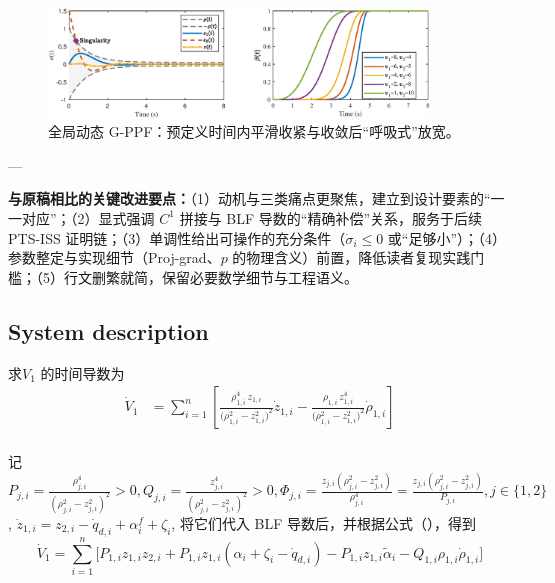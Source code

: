\documentclass[pdflatex,sn-mathphys-num]{sn-jnl}%
\theoremstyle{thmstyleone}%
\theoremstyle{thmstyletwo}%
\theoremstyle{thmstylethree}%
\begin{document}
\begin{figure}[H]
\centering
\includegraphics[width=0.9\textwidth]{fig1.eps}
\caption{全局动态 G-PPF：预定义时间内平滑收紧与收敛后“呼吸式”放宽。}
\label{fig:1}
\end{figure}

---

\noindent\textbf{与原稿相比的关键改进要点：}（1）动机与三类痛点更聚焦，建立到设计要素的“一一对应”；（2）显式强调 $C^1$ 拼接与 BLF 导数的“精确补偿”关系，服务于后续 PTS-ISS 证明链；（3）单调性给出可操作的充分条件（$\dot\sigma_i\le 0$ 或“足够小”）；（4）参数整定与实现细节（Proj-grad、$p$ 的物理含义）前置，降低读者复现实践门槛；（5）行文删繁就简，保留必要数学细节与工程语义。










\subsection{System description}



求$V_1$ 的时间导数为
\begin{equation}\label{eq:25}
	\begin{aligned}
\dot V_1
&=\sum_{i=1}^{n}\left[
\frac{\rho_{1,i}^4\,z_{1,i}}{\big(\rho_{1,i}^{2}-z_{1,i}^{2}\big)^{2}}\dot z_{1,i}
-
\frac{\rho_{1,i}\,z_{1,i}^{4}}{\big(\rho_{1,i}^{2}-z_{1,i}^{2}\big)^{2}}\dot \rho_{1,i}
\right]\\
\end{aligned}
\end{equation}

记
$
P_{j,i}=\frac{\rho_{j,i}^4}{(\rho_{j,i}^2-z_{j,i}^2)^2}>0,
Q_{j,i}=\frac{ z_{j,i}^4}{(\rho_{j,i}^2-z_{j,i}^2)^2}>0,
\Phi_{j,i}=\frac{z_{j,i}\left(\rho_{j,i}^{2}-z_{j,i}^{2}\right)}{\rho_{j,i}^{4}}=\frac{z_{j,i}(\rho_{j,i}^2-z_{j,i}^2)}{P_{j,i}}, j\in\{1,2\}
$,
$\dot z_{1,i}= z_{2,i}-\dot q_{d,i}+\alpha^{f}_i+\zeta_i$, 将它们代入 BLF 导数后，并根据公式（），得到
$$
\dot V_1=\sum_{i=1}^n\!\Big[P_{1,i} z_{1,i}z_{2,i}+P_{1,i}z_{1,i}(\alpha_i+\zeta_i-\dot q_{d,i})-P_{1,i}z_{1,i}\tilde\alpha_i-Q_{1,i}\rho_{1,i} \dot\rho_{1,i}\Big]
$$
\end{document}
